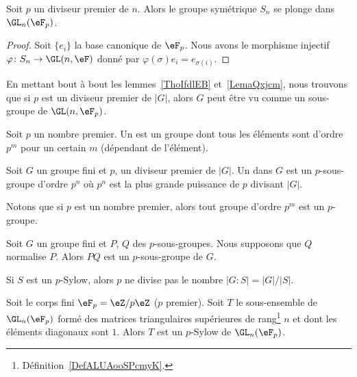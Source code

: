 \begin{lemma}       \label{LemaQxjcm}
    Soit \( p\) un diviseur premier de \( n\). Alors le groupe symétrique \( S_n\) se plonge dans \( \GL_n(\eF_p)\).
\end{lemma}

\begin{proof}
    Soit \( \{ e_i \}\) la base canonique de \( \eF_p\). Nous avons le morphisme injectif $\varphi\colon S_n\to \GL(n,\eF)$ donné par \( \varphi(\sigma)e_i=e_{\sigma(i)}\).
\end{proof}

\begin{remark}  \label{RemFzxxst}
    En mettant bout à bout les lemmes~\ref{ThoIfdlEB} et~\ref{LemaQxjcm}, nous trouvons que si \( p\) est un diviseur premier de \( | G |\), alors \( G\) peut être vu comme un sous-groupe de \( \GL(n,\eF_p)\).
\end{remark}

\begin{definition}      \label{DEFooPRCHooVZdwST}
    Soit \( p\) un nombre premier. Un  est un groupe dont tous les éléments sont d'ordre \( p^m\) pour un certain \( m\) (dépendant de l'élément).

    Soit \( G\) un groupe fini et \( p\), un diviseur premier de $| G |$. Un  dans \( G\) est un \( p\)-sous-groupe d'ordre \( p^n\) où \( p^n\) est la plus grande puissance de \( p\) divisant \( | G |\).
\end{definition}
Notons que si \( p\) est un nombre premier, alors tout groupe d'ordre \( p^m\) est un \( p\)-groupe.

\begin{lemma}
    Soit \( G\) un groupe fini et \( P\), \( Q\) des \( p\)-sous-groupes. Nous supposons que \( Q\) normalise \( P\). Alors \( PQ\) est un \( p\)-sous-groupe de \( G\).
\end{lemma}

Si \( S\) est un \( p\)-Sylow, alors \( p\) ne divise pas le nombre \( | G:S |=| G |/| S |\).

\begin{proposition}     \label{Propvocmon}
    Soit le corps fini \( \eF_p=\eZ/p\eZ\) (\( p\) premier). Soit \( T\) le sous-ensemble de \( \GL_n(\eF_p)\) formé des matrices triangulaires supérieures de rang\footnote{Définition~\ref{DefALUAooSPcmyK}.} \( n\) et dont les éléments diagonaux sont \( 1\). Alors \( T\) est un \( p\)-Sylow de \( \GL_n(\eF_p)\).
\end{proposition}

